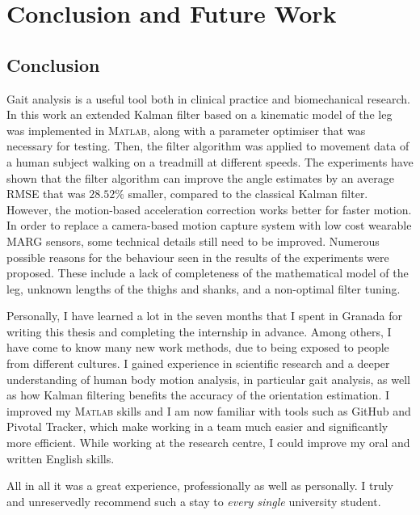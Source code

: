 \chapter{Conclusion and Future Work}
\label{ch:Conclusion and Future Work}

\section{Conclusion}

Gait analysis is a useful tool both in clinical practice and biomechanical research. In this work an extended Kalman filter based on a kinematic model of the leg was implemented in \textsc{Matlab}\textsuperscript{\textregistered}, along with a parameter optimiser that was necessary for testing. Then, the filter algorithm was applied to movement data of a human subject walking on a treadmill at different speeds. The experiments have shown that the filter algorithm can improve the angle estimates by an average RMSE that was $28.52\%$ smaller, compared to the classical Kalman filter.
However, the motion-based acceleration correction works better for faster motion. In order to replace a camera-based motion capture system with low cost wearable MARG sensors, some technical details still need to be improved. Numerous possible reasons for the behaviour seen in the results of the experiments were proposed. These include a lack of completeness of the mathematical model of the leg, unknown lengths of the thighs and shanks, and a non-optimal filter tuning.

Personally, I have learned a lot in the seven months that I spent in Granada for writing this thesis and completing the internship in advance. Among others, I have come to know many new work methods, due to being exposed to people from different cultures. I gained experience in scientific research and a deeper understanding of human body motion analysis, in particular gait analysis, as well as how Kalman filtering benefits the accuracy of the orientation estimation. I improved my \textsc{Matlab}\textsuperscript{\textregistered} skills and I am now familiar with tools such as GitHub and Pivotal Tracker, which make working in a team much easier and significantly more efficient.  While working at the research centre, I could improve my oral and written English skills.

All in all it was a great experience, professionally as well as personally. I truly and unreservedly recommend such a stay to \emph{every single} university student.

